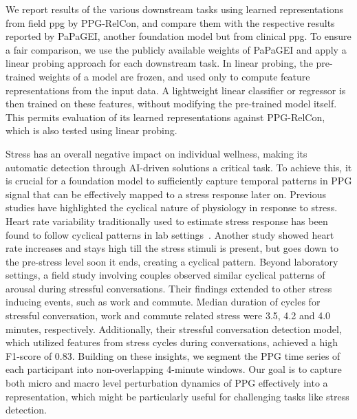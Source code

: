 We report results of the various downstream tasks using learned representations from field ppg by PPG-RelCon, and compare them with the respective results reported by PaPaGEI, another foundation model but from clinical ppg. To ensure a fair comparison, we use the publicly available weights of PaPaGEI and apply a linear probing approach for each downstream task. In linear probing, the pre-trained weights of a model are frozen, and used only to compute feature representations from the input data. A lightweight linear classifier or regressor is then trained on these features, without modifying the pre-trained model itself. This permits evaluation of its learned representations against PPG-RelCon, which is also tested using linear probing. 

Stress has an overall negative impact on individual wellness, making its automatic detection through AI-driven solutions a critical task. To achieve this, it is crucial for a foundation model to sufficiently capture temporal patterns in PPG signal that can be effectively mapped to a stress response later on. Previous studies have highlighted the cyclical nature of physiology in response to stress. Heart rate variability traditionally used to estimate stress response has been found to follow cyclical patterns in lab settings~\cite{lamichhane2017towards,wilson2018couples}. Another study showed heart rate increases and stays high till the stress stimuli is present, but goes down to the pre-stress level soon it ends, creating a cyclical pattern. Beyond laboratory settings, a field study\cite{bari2020automated} involving couples observed similar cyclical patterns of arousal during stressful conversations. Their findings extended to other stress inducing events, such as work and commute. Median duration of cycles for stressful conversation, work and commute related stress were 3.5, 4.2 and 4.0 minutes, respectively. Additionally, their stressful conversation detection model, which utilized features from stress cycles during conversations, achieved a high F1-score of 0.83. Building on these insights, we segment the PPG time series of each participant into non-overlapping 4-minute windows. Our goal is to capture both micro and macro level perturbation dynamics of PPG effectively into a representation, which might be particularly useful for challenging tasks like stress detection.




